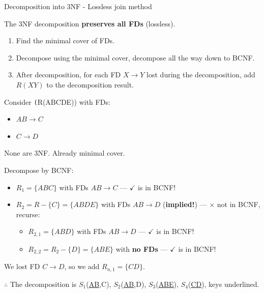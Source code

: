 \begin{theorem}
    {Decomposition into 3NF - Lossless join method}

    The 3NF decomposition \textbf{preserves all FDs} (lossless).

    \begin{enumerate}
        \item Find the minimal cover of FDs.
        \item Decompose using the minimal cover, decompose all the way down to BCNF.
        \item After decomposition, for each FD $X\to Y$ lost during the decomposition, add $R(XY)$ to the decomposition result.
    \end{enumerate}

    \tcblower

    Consider \texttt(R(ABCDE)) with FDs:
    \begin{itemize}
        \item $AB \to C$
        \item $C \to D$
    \end{itemize}

    None are 3NF. Already minimal cover.

    Decompose by BCNF:
    \begin{itemize}
        \item $R_1 = \{ABC\}$ with FDs $AB \to C$ --- $\checkmark$ is in BCNF!
        \item $R_2 = R - \{C\} = \{ABDE\}$ with FDs $AB \to D$ (\textbf{implied!}) --- $\times$ not in BCNF, recurse:
              \begin{itemize}
                  \item $R_{2,1} = \{ABD\}$ with FDs $AB \to D$ --- $\checkmark$ is in BCNF!
                  \item $R_{2,2} = R_2 - \{D\} = \{ABE\}$ with \textbf{no FDs} --- $\checkmark$ is in BCNF!
              \end{itemize}
    \end{itemize}

    We lost FD $C \to D$, so we add $R_{n,1} = \{CD\}$.

    $\therefore$ The decomposition is $S_1$(\underline{AB},C), $S_2$(\underline{AB},D), $S_3$(\underline{ABE}), $S_4$(\underline{CD}), keys underlined.
\end{theorem}

